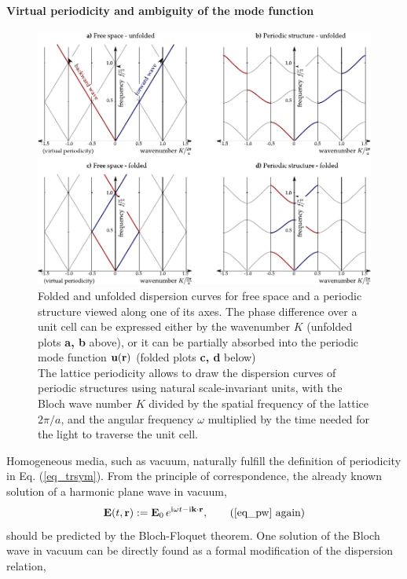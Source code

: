 \paragraph{Virtual periodicity and ambiguity of the mode function}%
\begin{figure}[ht] \caption{Folded and unfolded dispersion curves for free space and a periodic structure viewed along one of its axes. The phase difference over a unit cell can be expressed either by the wavenumber $K$ (unfolded plots \textbf{a, b} above), or it can be partially absorbed into the periodic mode function $\mathbf{u}({\mathbf{r}})$ (folded plots \textbf{c, d} below)\\
The lattice periodicity allows to draw the dispersion curves of periodic structures using natural scale-invariant units, with the Bloch wave number $K$ divided by the spatial frequency of the lattice $2\pi/a$, and the angular frequency $\omega$ multiplied by the time needed for the light to traverse the unit cell.
} \label{fg_phcfolding} \centering  %
	\includegraphics[width=\textwidth]{img/PhC_folding_illustration.pdf} 
\end{figure}
Homogeneous media, such as vacuum, naturally fulfill the definition of periodicity in Eq. (\ref{eq_trsym}).
From the principle of correspondence, 
the already known solution of a harmonic plane wave in vacuum, 
\begin{equation} \E(t, \rr) := \E_0\, e^{\ii\omega t - \ii\kk\cdot\rr}, \tag{\ref{eq_pw} \again} \end{equation}
should be predicted by the Bloch-Floquet theorem. One solution of the Bloch wave in vacuum can be directly found as a formal modification of the dispersion relation,
